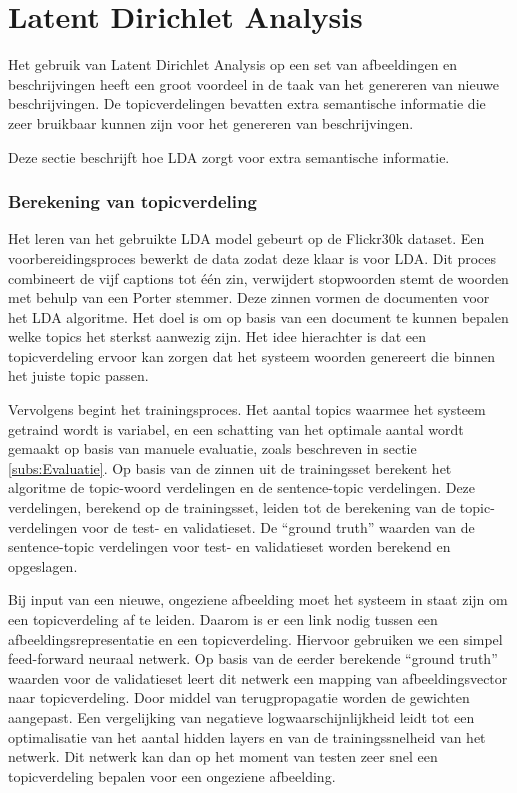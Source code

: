 \section{Latent Dirichlet Analysis}
Het gebruik van Latent Dirichlet Analysis op een set van afbeeldingen en beschrijvingen heeft een groot voordeel in de taak van het genereren van nieuwe beschrijvingen. De topicverdelingen bevatten extra semantische informatie die zeer bruikbaar kunnen zijn voor het genereren van beschrijvingen.

 Deze sectie beschrijft hoe LDA zorgt voor extra semantische informatie.

\subsubsection{Berekening van topicverdeling}
\label{subs:Berekening van topicverdeling}
Het leren van het gebruikte LDA model gebeurt op de Flickr30k dataset. Een voorbereidingsproces bewerkt de data zodat deze klaar is voor LDA. Dit proces combineert de vijf captions tot \'e\'en zin, verwijdert stopwoorden stemt de woorden met behulp van een Porter stemmer.  Deze zinnen vormen de documenten voor het LDA algoritme. Het doel is om op basis van een document te kunnen bepalen welke topics het sterkst aanwezig zijn. Het idee hierachter is dat een topicverdeling ervoor kan zorgen dat het systeem woorden genereert die binnen het juiste topic passen.

Vervolgens begint het trainingsproces. Het aantal topics waarmee het systeem getraind wordt is variabel, en een schatting van het optimale aantal wordt gemaakt op basis van manuele evaluatie, zoals beschreven in sectie \ref{subs:Evaluatie}. Op basis van de zinnen uit de trainingsset berekent het algoritme de topic-woord verdelingen en de sentence-topic verdelingen. Deze verdelingen, berekend op de trainingsset, leiden tot de berekening van de topic-verdelingen voor de test- en validatieset. De ``ground truth'' waarden van de sentence-topic verdelingen voor test- en validatieset worden berekend en opgeslagen.

Bij input van een nieuwe, ongeziene afbeelding moet het systeem in staat zijn om een topicverdeling af te leiden. Daarom is er een link nodig tussen een afbeeldingsrepresentatie en een topicverdeling. Hiervoor gebruiken we een simpel feed-forward neuraal netwerk. Op basis van de eerder berekende ``ground truth'' waarden voor de validatieset leert dit netwerk een mapping van afbeeldingsvector naar topicverdeling. Door middel van terugpropagatie worden de gewichten aangepast. Een vergelijking van negatieve logwaarschijnlijkheid leidt tot een optimalisatie van het aantal hidden layers en van de trainingssnelheid van het netwerk. Dit netwerk kan dan op het moment van testen zeer snel een topicverdeling bepalen voor een ongeziene afbeelding.

